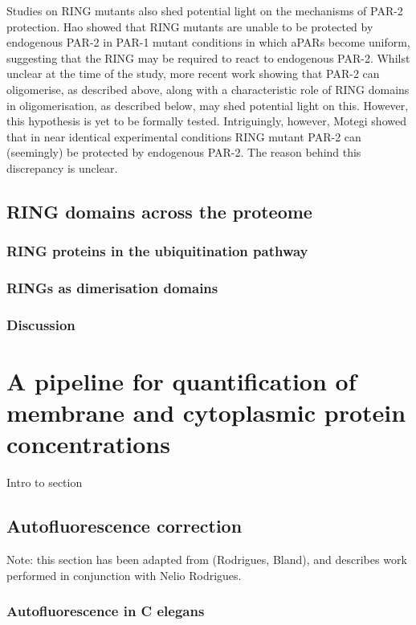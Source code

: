 \documentclass[12pt]{"article"}
\begin{document}
Studies on RING mutants also shed potential light on the mechanisms of PAR-2 protection. Hao showed that RING mutants are unable to be protected by endogenous PAR-2 in PAR-1 mutant conditions in which aPARs become uniform, suggesting that the RING may be required to react to endogenous PAR-2. Whilst unclear at the time of the study, more recent work showing that PAR-2 can oligomerise, as described above, along with a characteristic role of RING domains in oligomerisation, as described below, may shed potential light on this. However, this hypothesis is yet to be formally tested. Intriguingly, however, Motegi showed that in near identical experimental conditions RING mutant PAR-2 can (seemingly) be protected by endogenous PAR-2. The reason behind this discrepancy is unclear.\\


\clearpage
\subsection{RING domains across the proteome}
\subsubsection{RING proteins in the ubiquitination pathway}
\subsubsection{RINGs as dimerisation domains}
\subsubsection{Discussion}

\clearpage
\section{A pipeline for quantification of membrane and cytoplasmic protein concentrations}

Intro to section

\subsection{Autofluorescence correction}

Note: this section has been adapted from (Rodrigues, Bland), and describes work performed in conjunction with Nelio Rodrigues.

\subsubsection{Autofluorescence in C elegans}
\end{document}
